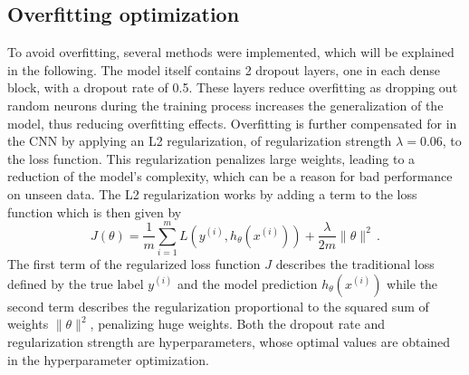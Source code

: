 \subsection{Overfitting optimization}
To avoid overfitting, several methods were implemented, which will be explained in the following. The model itself contains 2 dropout layers, one in each dense block, with a dropout rate of 0.5. These layers reduce overfitting as dropping out random neurons during the training process increases the generalization of the model, thus reducing overfitting effects. Overfitting is further compensated for in the CNN by applying an L2 regularization, of regularization strength $\lambda = 0.06$, to the loss function. This regularization penalizes large weights, leading to a reduction of the model's complexity, which can be a reason for bad performance on unseen data.
The L2 regularization works by adding a term to the loss function which is then given by $$J(\theta) = \frac{1}{m} \sum_{i=1}^{m} L(y^{(i)}, h_\theta(x^{(i)})) + \frac{\lambda}{2m} \|\theta\|^2 \, .$$ The first term of the regularized loss function $J$ describes the traditional loss defined by the true label $y^{\left(i\right)}$ and the model prediction $h_\theta\left(x^{\left(i\right)}\right)$ while the second term describes the regularization proportional to the squared sum of weights $\|\theta\|^2$, penalizing huge weights. Both the dropout rate and regularization strength are hyperparameters, whose optimal values are obtained in the hyperparameter optimization.
